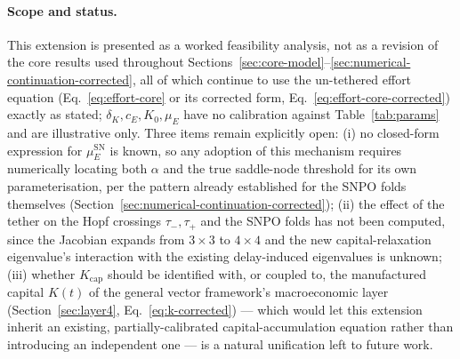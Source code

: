\documentclass[twocolumn,10pt]{article}
\begin{document}
\paragraph{Scope and status.} This extension is presented as a worked feasibility analysis, not as a revision of the core results used throughout Sections~\ref{sec:core-model}--\ref{sec:numerical-continuation-corrected}, all of which continue to use the un-tethered effort equation (Eq.~\eqref{eq:effort-core} or its corrected form, Eq.~\eqref{eq:effort-core-corrected}) exactly as stated; $\delta_K,c_E,K_0,\mu_E$ have no calibration against Table~\ref{tab:params} and are illustrative only. Three items remain explicitly open: (i) no closed-form expression for $\mu_E^{\text{SN}}$ is known, so any adoption of this mechanism requires numerically locating both $\alpha$ and the true saddle-node threshold for its own parameterisation, per the pattern already established for the SNPO folds themselves (Section~\ref{sec:numerical-continuation-corrected}); (ii) the effect of the tether on the Hopf crossings $\tau_-,\tau_+$ and the SNPO folds has not been computed, since the Jacobian expands from $3\times3$ to $4\times4$ and the new capital-relaxation eigenvalue's interaction with the existing delay-induced eigenvalues is unknown; (iii) whether $K_{\text{cap}}$ should be identified with, or coupled to, the manufactured capital $K(t)$ of the general vector framework's macroeconomic layer (Section~\ref{sec:layer4}, Eq.~\eqref{eq:k-corrected}) — which would let this extension inherit an existing, partially-calibrated capital-accumulation equation rather than introducing an independent one — is a natural unification left to future work.
\end{document}
